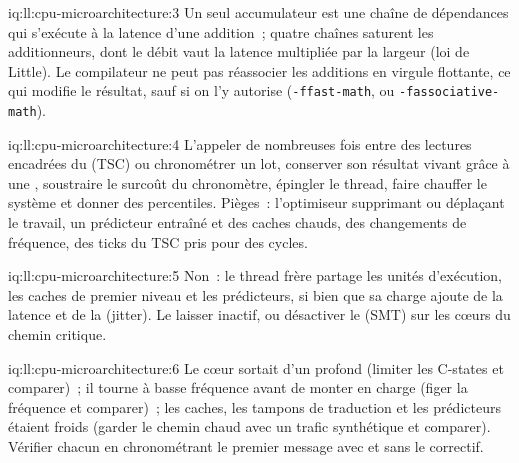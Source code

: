 \begin{solution}{iq:ll:cpu-microarchitecture:3}
Un seul accumulateur est une chaîne de dépendances qui s'exécute à la latence d'une addition~; quatre chaînes saturent les additionneurs, dont le
débit vaut la latence multipliée par la largeur (loi de Little). Le compilateur ne peut pas réassocier les additions en virgule flottante, ce qui
modifie le résultat, sauf si on l'y autorise (\texttt{-ffast-math}, ou \texttt{-fassociative-math}).
\end{solution}

\begin{solution}{iq:ll:cpu-microarchitecture:4}
L'appeler de nombreuses fois entre des lectures encadrées du  (TSC) ou chronométrer un lot, conserver son résultat vivant grâce à une
, soustraire le surcoût du chronomètre, épingler le thread, faire chauffer le système et donner des percentiles. Pièges~:
l'optimiseur supprimant ou déplaçant le travail, un prédicteur entraîné et des caches chauds, des changements de fréquence, des ticks du TSC pris pour
des cycles.
\end{solution}

\begin{solution}{iq:ll:cpu-microarchitecture:5}
Non~: le thread frère partage les unités d'exécution, les caches de premier niveau et les prédicteurs, si bien que sa charge ajoute de la latence et de la  (jitter).
Le laisser inactif, ou désactiver le  (SMT) sur les cœurs du chemin critique.
\end{solution}

\begin{solution}{iq:ll:cpu-microarchitecture:6}
Le cœur sortait d'un  profond (limiter les C-states et comparer)~; il tourne à basse fréquence avant de monter en charge (figer la
fréquence et comparer)~; les caches, les tampons de traduction et les prédicteurs étaient froids (garder le chemin chaud avec un
trafic synthétique et comparer). Vérifier chacun en chronométrant le premier message avec et sans le correctif.
\end{solution}

